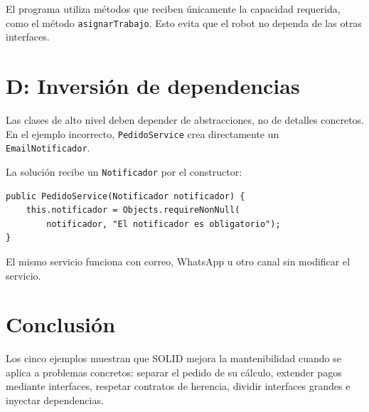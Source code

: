 \documentclass[12pt,a4paper]{article}
\begin{document}
El programa utiliza métodos que reciben únicamente la capacidad requerida,
como el método \texttt{asignarTrabajo}. Esto evita que
el robot no dependa de las otras interfaces.

\section{D: Inversión de dependencias}
Las clases de alto nivel deben depender de abstracciones, no de detalles
concretos. En el ejemplo incorrecto, \texttt{PedidoService} crea directamente
un \texttt{EmailNotificador}.

La solución recibe un \texttt{Notificador} por el constructor:

\begin{lstlisting}
public PedidoService(Notificador notificador) {
    this.notificador = Objects.requireNonNull(
        notificador, "El notificador es obligatorio");
}
\end{lstlisting}

El mismo servicio funciona con correo, WhatsApp u otro canal sin modificar el
servicio.

\section{Conclusión}
Los cinco ejemplos muestran que SOLID mejora la mantenibilidad cuando se aplica
a problemas concretos: separar el pedido de su cálculo, extender pagos mediante
interfaces, respetar contratos de herencia, dividir interfaces grandes e
inyectar dependencias.
\end{document}
